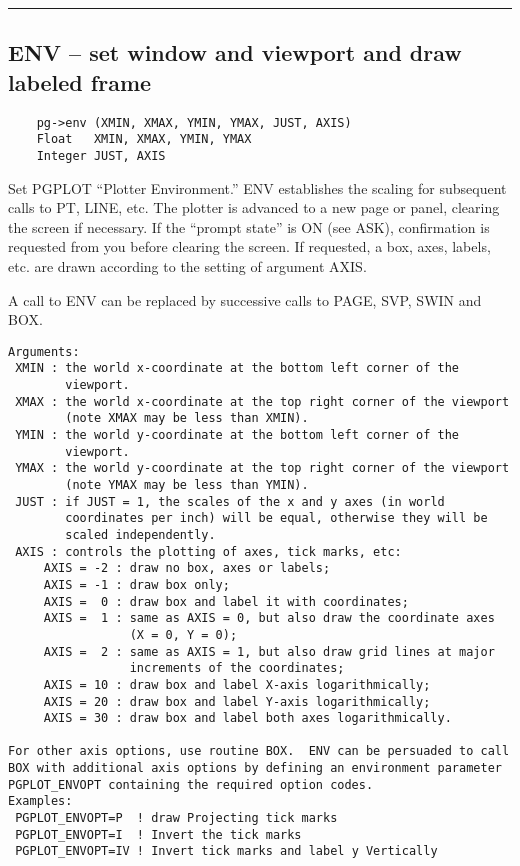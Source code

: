 \hrule

\subsection*{ENV -- set window and viewport and draw labeled frame }

\begin{verbatim}
    pg->env (XMIN, XMAX, YMIN, YMAX, JUST, AXIS)
    Float   XMIN, XMAX, YMIN, YMAX
    Integer JUST, AXIS
\end{verbatim}

Set PGPLOT ``Plotter Environment.''  ENV establishes the scaling for
subsequent calls to PT, LINE, etc.  The plotter is advanced to a new
page or panel, clearing the screen if necessary.  If the ``prompt
state'' is ON (see ASK), confirmation is requested from you
before clearing the screen.  If requested, a box, axes, labels,
etc. are drawn according to the setting of argument AXIS.

A call to ENV can be replaced by successive calls to PAGE, SVP, SWIN and BOX.

\begin{verbatim}
Arguments:
 XMIN : the world x-coordinate at the bottom left corner of the
        viewport. 
 XMAX : the world x-coordinate at the top right corner of the viewport
        (note XMAX may be less than XMIN). 
 YMIN : the world y-coordinate at the bottom left corner of the
        viewport. 
 YMAX : the world y-coordinate at the top right corner of the viewport
        (note YMAX may be less than YMIN). 
 JUST : if JUST = 1, the scales of the x and y axes (in world
        coordinates per inch) will be equal, otherwise they will be
        scaled independently.  
 AXIS : controls the plotting of axes, tick marks, etc:
     AXIS = -2 : draw no box, axes or labels;
     AXIS = -1 : draw box only;
     AXIS =  0 : draw box and label it with coordinates;
     AXIS =  1 : same as AXIS = 0, but also draw the coordinate axes
                 (X = 0, Y = 0); 
     AXIS =  2 : same as AXIS = 1, but also draw grid lines at major
                 increments of the coordinates; 
     AXIS = 10 : draw box and label X-axis logarithmically;
     AXIS = 20 : draw box and label Y-axis logarithmically;
     AXIS = 30 : draw box and label both axes logarithmically. 

For other axis options, use routine BOX.  ENV can be persuaded to call
BOX with additional axis options by defining an environment parameter
PGPLOT_ENVOPT containing the required option codes.
Examples:
 PGPLOT_ENVOPT=P  ! draw Projecting tick marks
 PGPLOT_ENVOPT=I  ! Invert the tick marks
 PGPLOT_ENVOPT=IV ! Invert tick marks and label y Vertically
\end{verbatim}

